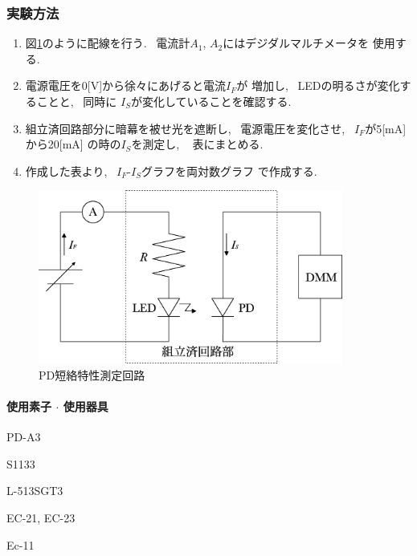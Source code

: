 \documentclass[titlepage]{jsarticle}
\begin{document}
        \subsubsection{実験方法}
            \begin{enumerate}
                \item 図\ref{fig:短絡特性回路}のように配線を行う.
                    ~電流計$A_1$, $A_2$にはデジダルマルチメータを
                    使用する.
                \item 電源電圧を0[V]から徐々にあげると電流$I_F$が
                    増加し, ~LEDの明るさが変化することと, ~同時に
                    $I_S$が変化していることを確認する.
                \item 組立済回路部分に暗幕を被せ光を遮断し,
                    ~電源電圧を変化させ, ~$I_F$が5[mA]から20[mA]
                    の時の$I_S$を測定し, ~ 表にまとめる.
                \item 作成した表より, ~$I_F$-$I_S$グラフを両対数グラフ
                    で作成する.
            \end{enumerate}

            \begin{figure}[ht]
                \centering
                \includegraphics[width=10cm]{images/tanraku.eps}
                \caption{PD短絡特性測定回路}
                \label{fig:短絡特性回路}
            \end{figure}
            
            \paragraph{使用素子 $\cdot$ 使用器具}
                \begin{description}
                    \setlength{\leftskip}{1.5em}
                    \item[組立済回路] PD-A3
                    \item[PD] S1133
                    \item[LED] L-513SGT3
                    \item[デジタルマルチメータ] EC-21, EC-23
                    \item[直流電源] Ec-11
                \end{description}
\end{document}
